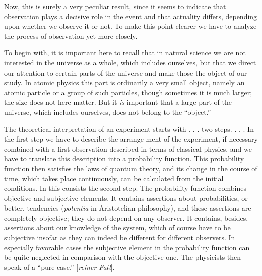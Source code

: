 Now, this is surely a very peculiar result, since it seems to indicate
that observation plays a decisive role in the event and that actuality
differs, depending upon whether we observe it or not. To make this point
clearer we have to analyze the process of observation yet more closely.

To begin with, it is important here to recall that in natural science we
are not interested in the universe as a whole, which includes ourselves,
but that we direct our attention to certain parts of the universe and
make those the object of our study. In atomic physics this part is
ordinarily a very small object, namely an atomic particle or a group of
such particles, though sometimes it is much larger; the size does not
here matter. But it \emph{is} important that a large part of the
universe, which includes ourselves, does not belong to the ``object.''

The theoretical interpretation of an experiment starts with . . . two
steps. . . . In the first step we have to describe the arrange-ment of
the experiment, if necessary combined with a first observation described
in terms of classical physics, and we have to translate this description
into a probability function. This probability function then satisfies
the laws of quantum theory, and its change in the course of time, which
takes place continuously, can be calculated from the initial conditions.
In this consists the second step. The probability function combines
objective and subjective elements. It contains assertions about
probabilities, or better, tendencies (\emph{potentia} in Aristotelian
philosophy), and these assertions are completely objective; they do not
depend on any observer. It contains, besides, assertions about our
knowledge of the system, which of course have to be subjective insofar
as they can indeed be different for different observers. In especially
favorable cases the subjective element in the probability function can
be quite neglected in comparison with the objective one. The physicists
then speak of a ``pure case.'' {[}\emph{reiner Fall}{]}.

